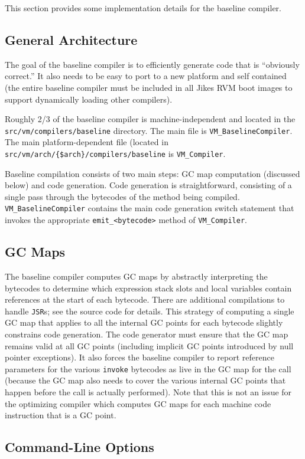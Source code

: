 This section provides some implementation details for the baseline
compiler. 

\subsection{General Architecture}
The goal of the baseline compiler is to efficiently generate code that
is ``obviously correct.'' It also needs to be easy to port to a new
platform and self contained (the entire baseline compiler must be
included in all Jikes RVM boot images to support dynamically loading
other compilers). 

Roughly 2/3 of the baseline compiler is machine-independent and
located in the {\tt src/vm/compilers/baseline} directory. The main file is
{\tt VM\_BaselineCompiler}. The main platform-dependent file (located
in {\tt src/vm/arch/\{\$arch\}/compilers/baseline} is {\tt VM\_Compiler}. 

Baseline compilation consists of two main steps: GC map computation
(discussed below) and code generation.  Code generation is
straightforward, consisting of a single pass through the
bytecodes of the method being compiled. {\tt VM\_BaselineCompiler}
contains the main code generation switch statement that invokes the
appropriate {\tt emit\_<bytecode>} method of {\tt VM\_Compiler}. 

\subsection{GC Maps}
The baseline compiler computes GC maps by abstractly interpreting the
bytecodes to determine which expression stack slots and local
variables contain references at the start of each bytecode. There are
additional compilations to handle {\tt JSR}s; see the source code for
details. This strategy of computing a single GC map that applies to
all the internal GC points for each bytecode slightly constrains code
generation. The code generator must ensure that the GC map remains
valid at all GC points (including implicit GC points introduced by
null pointer exceptions). It also forces the baseline compiler to
report reference parameters for the various {\tt invoke} bytecodes as
live in the GC map for the call (because the GC map also needs to
cover the various internal GC points that happen before the call is
actually performed). Note that this is not an issue for the optimizing
compiler which computes GC maps for each machine code instruction that
is a GC point. 

\subsection{Command-Line Options}

